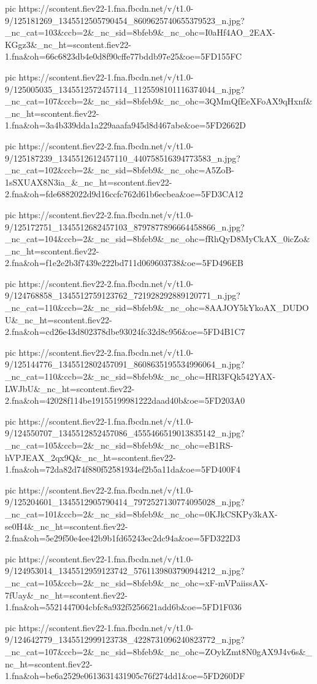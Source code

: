 pic https://scontent.fiev22-1.fna.fbcdn.net/v/t1.0-9/125181269_1345512505790454_8609625740655379523_n.jpg?_nc_cat=103&ccb=2&_nc_sid=8bfeb9&_nc_ohc=I0aHf4AO_2EAX-KGgz3&_nc_ht=scontent.fiev22-1.fna&oh=66c6823db4e0d8f90cffe77bddb97e25&oe=5FD155FC

pic https://scontent.fiev22-1.fna.fbcdn.net/v/t1.0-9/125005035_1345512572457114_1125598101116374044_n.jpg?_nc_cat=107&ccb=2&_nc_sid=8bfeb9&_nc_ohc=3QMmQfEeXFoAX9qHxnf&_nc_ht=scontent.fiev22-1.fna&oh=3a4b339dda1a229aaafa945d8d467abe&oe=5FD2662D

pic https://scontent.fiev22-2.fna.fbcdn.net/v/t1.0-9/125187239_1345512612457110_440758516394773583_n.jpg?_nc_cat=102&ccb=2&_nc_sid=8bfeb9&_nc_ohc=A5ZoB-1sSXUAX8N3ia_&_nc_ht=scontent.fiev22-2.fna&oh=fde6882022d9d16ccfc762d61b6ecbea&oe=5FD3CA12

pic https://scontent.fiev22-2.fna.fbcdn.net/v/t1.0-9/125172751_1345512682457103_8797877896664458866_n.jpg?_nc_cat=104&ccb=2&_nc_sid=8bfeb9&_nc_ohc=fRhQyD8MyCkAX_0icZo&_nc_ht=scontent.fiev22-2.fna&oh=f1e2e2b3f7439e222bd711d069603738&oe=5FD496EB

pic https://scontent.fiev22-2.fna.fbcdn.net/v/t1.0-9/124768858_1345512759123762_721928292889120771_n.jpg?_nc_cat=110&ccb=2&_nc_sid=8bfeb9&_nc_ohc=8AAJOY5kYkoAX_DUDOU&_nc_ht=scontent.fiev22-2.fna&oh=cd26e43d802378dbe93024fc32d8c956&oe=5FD4B1C7

pic https://scontent.fiev22-2.fna.fbcdn.net/v/t1.0-9/125144776_1345512802457091_8608635195534996064_n.jpg?_nc_cat=110&ccb=2&_nc_sid=8bfeb9&_nc_ohc=HRl3FQk542YAX-LWJbU&_nc_ht=scontent.fiev22-2.fna&oh=42028f114be19155199981222daad40b&oe=5FD203A0

pic https://scontent.fiev22-1.fna.fbcdn.net/v/t1.0-9/124550707_1345512852457086_4555466519013835142_n.jpg?_nc_cat=105&ccb=2&_nc_sid=8bfeb9&_nc_ohc=eB1RS-hVPJEAX_2qx9Q&_nc_ht=scontent.fiev22-1.fna&oh=72da82d74f880f52581934ef2b5a11da&oe=5FD400F4

pic https://scontent.fiev22-2.fna.fbcdn.net/v/t1.0-9/125204601_1345512905790414_7972527130774095028_n.jpg?_nc_cat=101&ccb=2&_nc_sid=8bfeb9&_nc_ohc=0KJkCSKPy3kAX-se0H4&_nc_ht=scontent.fiev22-2.fna&oh=5e29f50e4ee42b9b1fd65243ec2dc94a&oe=5FD322D3

pic https://scontent.fiev22-1.fna.fbcdn.net/v/t1.0-9/124953014_1345512959123742_5761139803790944212_n.jpg?_nc_cat=105&ccb=2&_nc_sid=8bfeb9&_nc_ohc=xF-mVPaiissAX-7fUay&_nc_ht=scontent.fiev22-1.fna&oh=5521447004cbfc8a932f5256621add6b&oe=5FD1F036

pic https://scontent.fiev22-1.fna.fbcdn.net/v/t1.0-9/124642779_1345512999123738_4228731096240823772_n.jpg?_nc_cat=107&ccb=2&_nc_sid=8bfeb9&_nc_ohc=ZOykZmt8N0gAX9J4v6s&_nc_ht=scontent.fiev22-1.fna&oh=be6a2529e0613631431905c76f274dd1&oe=5FD260DF

